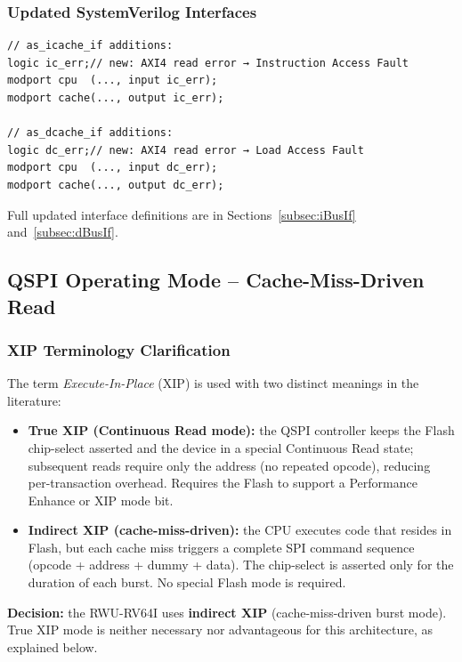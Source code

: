 \subsubsection{Updated SystemVerilog Interfaces}

\begin{verbatim}
// as_icache_if additions:
logic ic_err;// new: AXI4 read error → Instruction Access Fault
modport cpu  (..., input ic_err);
modport cache(..., output ic_err);

// as_dcache_if additions:
logic dc_err;// new: AXI4 read error → Load Access Fault
modport cpu  (..., input dc_err);
modport cache(..., output dc_err);
\end{verbatim}

Full updated interface definitions are in
Sections~\ref{subsec:iBusIf} and~\ref{subsec:dBusIf}.

\subsection{QSPI Operating Mode -- Cache-Miss-Driven Read}
\label{subsec:qspiMode}

\subsubsection{XIP Terminology Clarification}

The term \emph{Execute-In-Place} (XIP) is used with two distinct meanings
in the literature:

\begin{itemize}
  \item \textbf{True XIP (Continuous Read mode):} the QSPI controller
    keeps the Flash chip-select asserted and the device in a special
    Continuous Read state; subsequent reads require only the address
    (no repeated opcode), reducing per-transaction overhead.
    Requires the Flash to support a Performance Enhance or XIP mode bit.
  \item \textbf{Indirect XIP (cache-miss-driven):} the CPU executes code
    that resides in Flash, but each cache miss triggers a complete SPI
    command sequence (opcode + address + dummy + data).
    The chip-select is asserted only for the duration of each burst.
    No special Flash mode is required.
\end{itemize}

\textbf{Decision:} the RWU-RV64I uses \textbf{indirect XIP}
(cache-miss-driven burst mode).
True XIP mode is neither necessary nor advantageous for this architecture,
as explained below.

